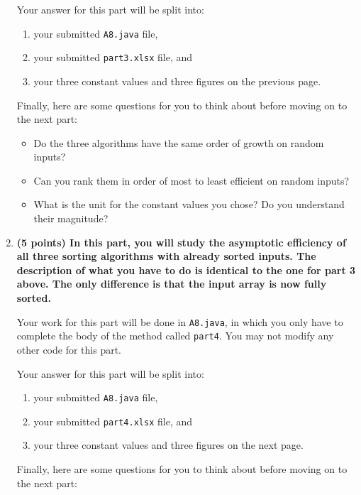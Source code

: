 \documentclass[12pt]{article}
\begin{document}
\begin{enumerate}
{ Your answer for this part will be split into:
 \begin{enumerate}
 \item your submitted {\tt A8.java} file,
 \item your submitted {\tt part3.xlsx} file, and
 \item your three constant values and three figures on the previous page.
 \end{enumerate}

 Finally, here are some questions for you to think about before moving on to the
 next part:

 \begin{itemize}
     \item Do the three algorithms have the same order of growth on random
     inputs?
     \item Can you rank them in order of most to least efficient on random
     inputs?
     \item What is the unit for the constant values you chose? Do you understand
     their magnitude?
   \end{itemize}
 }

   \item                            %
   {\bf \color{red} (5 points) In this part, you will study the asymptotic
   efficiency of all three sorting algorithms with already sorted inputs. The
   description of what you have to do is identical to the one for part 3 above.
   The only difference is that the input array is now fully sorted.

  Your work for this part will be done in {\tt A8.java}, in which you only
  have to complete the body of the method called {\tt part4}. You may not
  modify any other code for this part.

 Your answer for this part will be split into:
 \begin{enumerate}
 \item your submitted {\tt A8.java} file,
 \item your submitted {\tt part4.xlsx} file, and
 \item your three constant values and three figures on the next page.
 \end{enumerate}

 Finally, here are some questions for you to think about before moving on to the
 next part:

}
\end{enumerate}
\end{document}
